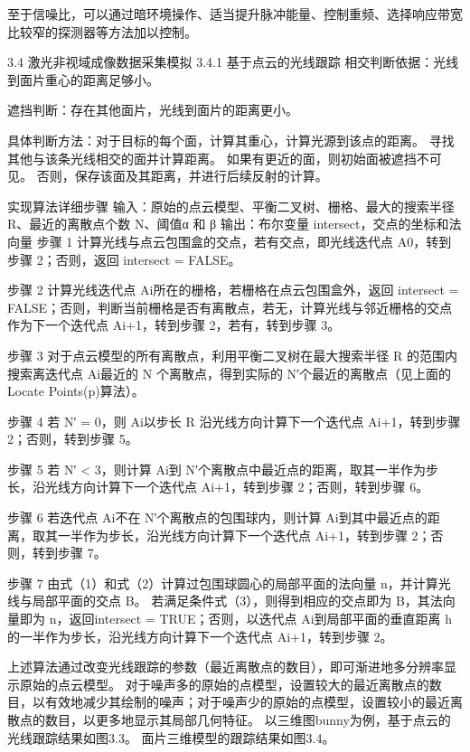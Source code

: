 至于信噪比，可以通过暗环境操作、适当提升脉冲能量、控制重频、选择响应带宽比较窄的探测器等方法加以控制。

3.4  激光非视域成像数据采集模拟
3.4.1 基于点云的光线跟踪
相交判断依据：光线到面片重心的距离足够小。

遮挡判断：存在其他面片，光线到面片的距离更小。

具体判断方法：对于目标的每个面，计算其重心，计算光源到该点的距离。
寻找其他与该条光线相交的面并计算距离。
如果有更近的面，则初始面被遮挡不可见。
否则，保存该面及其距离，并进行后续反射的计算。

实现算法详细步骤
输入：原始的点云模型、平衡二叉树、栅格、最大的搜索半径 R、最近的离散点个数 N、阈值α 和 β 输出：布尔变量 intersect，交点的坐标和法向量 
步骤 1   计算光线与点云包围盒的交点，若有交点，即光线迭代点 A0，转到步骤 2；否则，返回 intersect = FALSE。
 
步骤 2   计算光线迭代点 Ai所在的栅格，若栅格在点云包围盒外，返回 intersect = FALSE；否则，判断当前栅格是否有离散点，若无，计算光线与邻近栅格的交点作为下一个迭代点 Ai+1，转到步骤 2，若有，转到步骤 3。
 
步骤 3   对于点云模型的所有离散点，利用平衡二叉树在最大搜索半径 R 的范围内搜索离迭代点 Ai最近的 N 个离散点，得到实际的 N′个最近的离散点（见上面的 Locate Points(p)算法）。
 
步骤 4   若 N′ = 0，则 Ai以步长 R 沿光线方向计算下一个迭代点 Ai+1，转到步骤 2；否则，转到步骤 5。
 
步骤 5   若 N′ < 3，则计算 Ai到 N′个离散点中最近点的距离，取其一半作为步长，沿光线方向计算下一个迭代点 Ai+1，转到步骤 2；否则，转到步骤 6。
 
步骤 6   若迭代点 Ai不在 N′个离散点的包围球内，则计算 Ai到其中最近点的距离，取其一半作为步长，沿光线方向计算下一个迭代点 Ai+1，转到步骤 2；否则，转到步骤 7。
 
步骤 7   由式（1）和式（2）计算过包围球圆心的局部平面的法向量 n，并计算光线与局部平面的交点 B。
若满足条件式（3），则得到相应的交点即为 B，其法向量即为 n，返回intersect = TRUE；否则，以迭代点 Ai到局部平面的垂直距离 h 的一半作为步长，沿光线方向计算下一个迭代点 Ai+1，转到步骤 2。
 
上述算法通过改变光线跟踪的参数（最近离散点的数目），即可渐进地多分辨率显示原始的点云模型。
对于噪声多的原始的点模型，设置较大的最近离散点的数目，以有效地减少其绘制的噪声；对于噪声少的原始的点模型，设置较小的最近离散点的数目，以更多地显示其局部几何特征。
以三维图bunny为例，基于点云的光线跟踪结果如图3.3。
面片三维模型的跟踪结果如图3.4。


